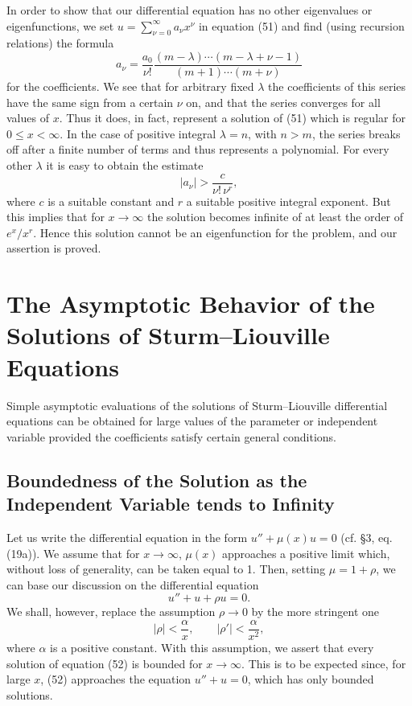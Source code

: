 In order to show that our differential equation has no other eigenvalues or eigenfunctions, we set $u=\sum_{\nu=0}^{\infty}a_\nu x^\nu$ in equation (51) and find (using recursion relations) the formula
\[
a_\nu=\frac{a_0}{\nu!}\frac{(m-\lambda)\cdots(m-\lambda+\nu-1)}{(m+1)\cdots(m+\nu)}
\]
for the coefficients. We see that for arbitrary fixed $\lambda$ the coefficients of this series have the same sign from a certain $\nu$ on, and that the series converges for all values of $x$. Thus it does, in fact, represent a solution of (51) which is regular for $0\le x<\infty$. In the case of positive integral $\lambda=n$, with $n>m$, the series breaks off after a finite number of terms and thus represents a polynomial. For every other $\lambda$ it is easy to obtain the estimate
\[
|a_\nu|>\frac{c}{\nu!\,\nu^r},
\]
where $c$ is a suitable constant and $r$ a suitable positive integral exponent. But this implies that for $x\to\infty$ the solution becomes infinite of at least the order of $e^x/x^r$. Hence this solution cannot be an eigenfunction for the problem, and our assertion is proved.

\section{The Asymptotic Behavior of the Solutions of Sturm--Liouville Equations}
Simple asymptotic evaluations of the solutions of Sturm--Liouville differential equations can be obtained for large values of the parameter or independent variable provided the coefficients satisfy certain general conditions.

\subsection{Boundedness of the Solution as the Independent Variable tends to Infinity}
Let us write the differential equation in the form $u''+\mu(x)u=0$ (cf. \S3, eq. (19a)). We assume that for $x\to\infty$, $\mu(x)$ approaches a positive limit which, without loss of generality, can be taken equal to 1. Then, setting $\mu=1+\rho$, we can base our discussion on the differential equation
\begin{equation}
u''+u+\rho u=0.
\tag{52}
\end{equation}
We shall, however, replace the assumption $\rho\to0$ by the more stringent one
\begin{equation}
|\rho|<\frac{\alpha}{x},\qquad |\rho'|<\frac{\alpha}{x^2},
\tag{53}
\end{equation}
where $\alpha$ is a positive constant. With this assumption, we assert that every solution of equation (52) is bounded for $x\to\infty$. This is to be expected since, for large $x$, (52) approaches the equation $u''+u=0$, which has only bounded solutions.

